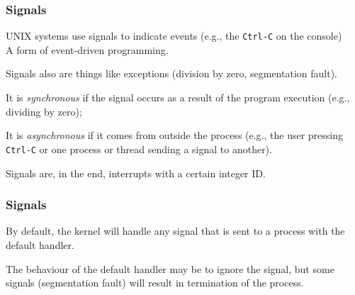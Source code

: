 \begin{frame}
\frametitle{Signals}

UNIX systems use signals to indicate events (e.g., the \texttt{Ctrl-C} on the console)\\
\quad A form of event-driven programming. 

Signals also are things like exceptions (division by zero, segmentation fault).

It is \textit{synchronous} if the signal occurs as a result of the program execution (e.g., dividing by zero); 

It is \textit{asynchronous} if it comes from outside the process (e.g., the user pressing \texttt{Ctrl-C} or one process or thread sending a signal to another). 

Signals are, in the end, interrupts with a certain integer ID.


\end{frame}


\begin{frame}
\frametitle{Signals}

By default, the kernel will handle any signal that is sent to a process with the default handler. 

The behaviour of the default handler may be to ignore the signal, but some signals (segmentation fault) will result in termination of the process. 


\end{frame}


